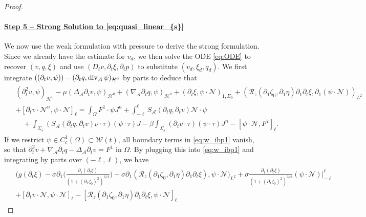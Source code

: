 \documentclass[letterpaper,reqno,10pt,twoside]{amsart}
\theoremstyle{definition}
\theoremstyle{remark}
\def\p{\partial}
\def\Om{\Omega}
\def\dive{\mathop{\rm div}\nolimits}
\begin{document}
\begin{proof}
		\paragraph{\underline{Step 5 -- Strong Solution to \eqref{eq:quasi_linear_{s}}}}
		We now use the weak formulation with pressure to derive the strong formulation. Since we already have the estimate for $v_{d}$, we then solve the ODE \eqref{eq:ODE} to recover $(v,q,\xi)$ and use $(D_{t}v,\p_{t}\xi,\p_{t}p)$ to substitute $(v_{d},\xi_{d},q_{d})$. We first integrate $((\p_{t}v,\psi))-(\p_{t}q,\dive_{\mathcal{A}}\psi)_{\mathcal{H}^0}$ by parts to deduce that
		\begin{align}\label{eq:w_ibp1}
			\begin{aligned}
				&(\p_t^{2}v,\psi)_{\mathcal{H}^0}-\mu(\Delta_{\mathcal{A}}\p_{t}v,\psi)_{\mathcal{H}^0}+(\nabla_{\mathcal{A}}\p_{t}q, \psi)_{\mathcal{H}^0}+(\p_{t}\xi,\psi\cdot\mathcal{N})_{1,\Sigma_{0}}+(\mathcal{R}_{z}(\partial_{1}\zeta_{0},\partial_{1}\eta)\partial_{1}\partial_{t}\xi,\partial_{1}(\psi\cdot\mathcal{N}))_{L^{2}}\\&+ [\p_{t}v\cdot \mathcal{N}^{n},\psi\cdot\mathcal{N}]_{\ell}
				=\int_{\Om}F^1\cdot \psi J^{n}+\int_{-\ell}^\ell S_{\mathcal{A}}(\p_{t}q, \p_{t}v)\mathcal{N} \cdot \psi\\
				&\quad+\int_{\Sigma_s}\left(S_{\mathcal{A}}(\p_{t}q, \p_{t}v)\nu\cdot\tau\right) (\psi\cdot\tau)J-\beta\int_{\Sigma_s}(\p_{t}v\cdot\tau)(\psi\cdot\tau)J^{n}-[\psi\cdot\mathcal{N},F^7]_\ell.
			\end{aligned}
		\end{align}
		If we restrict $\psi \in C_c^1(\Om) \subset \mathcal{W}(t)$, all boundary terms in \eqref{eq:w_ibp1} vanish, so that $\p_t^{2}v + \nabla_{\mathcal{A}}\p_{t}q - \Delta_{\mathcal{A}}\p_{t}v= F^1$ in $\Om$. By plugging this into \eqref{eq:w_ibp1} and integrating by parts over $(-\ell, \ell)$, we have
		\begin{align}\label{eq:w_ibp2}
			\begin{aligned}
				&\bigg(g(\p_{t}\xi )-\sigma\p_1\Big(\frac{\p_1(\p_{t}\xi)}{(1+(\p_1\zeta_0)^2)^{3/2}}\Big)-\sigma\partial_{1}(\mathcal{R}_{z}(\partial_{1}\zeta_{0},\partial_{1}\eta)\partial_{1}\partial_{t}\xi),\psi\cdot\mathcal{N} \bigg)_{L^{2}} + \sigma\frac{\p_1(\p_{t}\xi)}{(1+(\p_1\zeta_0)^2)^{3/2}}(\psi\cdot\mathcal{N})\Big|_{-\ell}^\ell\\& +[\p_{t}v\cdot \mathcal{N},\psi\cdot\mathcal{N}]_{\ell}-[\mathcal{R}_{z}(\partial_{1}\zeta_{0},\partial_{1}\eta)\partial_{1}\partial_{t}\xi,\psi\cdot\mathcal{N}]_{\ell}

\end{aligned}
\end{align}
\end{proof}
\end{document}
